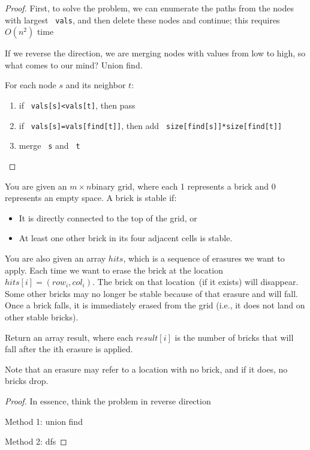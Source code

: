 \documentclass[11pt]{article}
\let\OldTexttt\texttt
\renewcommand{\texttt}[1]{\OldTexttt{\color{MidnightBlue} #1}}
\begin{document}
\begin{proof}
First, to solve the problem, we can enumerate the paths from the nodes with largest \texttt{vals}, and
then delete these nodes and continue; this requires \(O(n^2)\) time

If we reverse the direction, we are merging nodes with values from low to high, so what comes to
our mind? Union find.

For each node \(s\) and its neighbor \(t\):
\begin{enumerate}
\item if \texttt{vals[s]<vals[t]}, then pass
\item if \texttt{vals[s]=vals[find[t]]}, then add \texttt{size[find[s]]*size[find[t]]}
\item merge \texttt{s} and \texttt{t}
\end{enumerate}
\end{proof}

\begin{problem}
You are given an \(m\times n\)binary grid, where each 1 represents a brick and 0 represents an empty
space. A brick is stable if:
\begin{itemize}
\item It is directly connected to the top of the grid, or
\item At least one other brick in its four adjacent cells is stable.
\end{itemize}

You are also given an array \(hits\), which is a sequence of erasures we want to apply. Each time we
want to erase the brick at the location \(hits[i] = (row_i, col_i)\). The brick on that location (if
it exists) will disappear. Some other bricks may no longer be stable because of that erasure and
will fall. Once a brick falls, it is immediately erased from the grid (i.e., it does not land on
other stable bricks).

Return an array result, where each \(result[i]\) is the number of bricks that will fall after the ith erasure is applied.

Note that an erasure may refer to a location with no brick, and if it does, no bricks drop.
\end{problem}

\begin{proof}
In essence, think the problem in reverse direction

Method 1: union find

Method 2: dfs
\end{proof}
\end{document}
